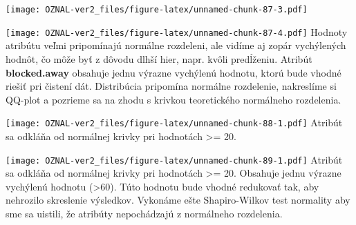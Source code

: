\documentclass[
]{article}
\newenvironment{Shaded}{\begin{snugshade}}{\end{snugshade}}
\newcommand{\AttributeTok}[1]{\textcolor[rgb]{0.77,0.63,0.00}{#1}}
\newcommand{\DecValTok}[1]{\textcolor[rgb]{0.00,0.00,0.81}{#1}}
\newcommand{\FunctionTok}[1]{\textcolor[rgb]{0.00,0.00,0.00}{#1}}
\newcommand{\NormalTok}[1]{#1}
\newcommand{\SpecialCharTok}[1]{\textcolor[rgb]{0.00,0.00,0.00}{#1}}
\newcommand{\StringTok}[1]{\textcolor[rgb]{0.31,0.60,0.02}{#1}}
\begin{document}
\texttt{[image: OZNAL-ver2\_files/figure-latex/unnamed-chunk-87-3.pdf]}

\begin{Shaded}
\end{Shaded}

\texttt{[image: OZNAL-ver2\_files/figure-latex/unnamed-chunk-87-4.pdf]}
Hodnoty atribútu veľmi pripomínajú normálne rozdeleni, ale vidíme aj
zopár vychýlených hodnôt, čo môže byť z dôvodu dlhší hier, napr. kvôli
predĺženiu. Atribút \textbf{blocked.away} obsahuje jednu výrazne
vychýlenú hodnotu, ktorú bude vhodné riešiť pri čistení dát. Distribúcia
pripomína normálne rozdelenie, nakreslíme si QQ-plot a pozrieme sa na
zhodu s krivkou teoretického normálneho rozdelenia.

\begin{Shaded}
\end{Shaded}

\texttt{[image: OZNAL-ver2\_files/figure-latex/unnamed-chunk-88-1.pdf]}
Atribút sa odkláňa od normálnej krivky pri hodnotách \textgreater= 20.

\begin{Shaded}
\end{Shaded}

\texttt{[image: OZNAL-ver2\_files/figure-latex/unnamed-chunk-89-1.pdf]}
Atribút sa odkláňa od normálnej krivky pri hodnotách \textgreater= 20.
Obsahuje jednu výrazne vychýlenú hodnotu (\textgreater60). Túto hodnotu
bude vhodné redukovať tak, aby nehrozilo skreslenie výsledkov. Vykonáme
ešte Shapiro-Wilkov test normality aby sme sa uistili, že atribúty
nepochádzajú z normálneho rozdelenia.
\end{document}
